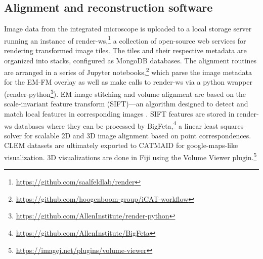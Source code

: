 \subsection{Alignment and reconstruction software}
Image data from the integrated microscope is uploaded to a local storage server running an instance of render-ws,\footnote{\href{https://github.com/saalfeldlab/render}{https://github.com/saalfeldlab/render}} a collection of open-source web services for rendering transformed image tiles. The tiles and their respective metadata are organized into stacks, configured as MongoDB databases. The alignment routines are arranged in a series of Jupyter notebooks,\footnote{\href{https://github.com/hoogenboom-group/iCAT-workflow}{https://github.com/hoogenboom-group/iCAT-workflow}} which parse the image metadata for the EM-FM overlay as well as make calls to render-ws via a python wrapper (render-python\footnote{\href{https://github.com/AllenInstitute/render-python}{https://github.com/AllenInstitute/render-python}}). EM image stitching and volume alignment are based on the scale-invariant feature transform (SIFT)---an algorithm designed to detect and match local features in corresponding images \cite{lowe1999object}. SIFT features are stored in render-ws databases where they can be processed by BigFeta,\footnote{\href{https://github.com/AllenInstitute/BigFeta}{https://github.com/AllenInstitute/BigFeta}} a linear least squares solver for scalable 2D and 3D image alignment based on point correspondences. CLEM datasets are ultimately exported to CATMAID \cite{saalfeld2009catmaid} for google-maps-like visualization. 3D visualizations are done in Fiji \cite{schindelin2012fiji} using the Volume Viewer plugin.\footnote{\href{https://imagej.net/plugins/volume-viewer}{https://imagej.net/plugins/volume-viewer}}
